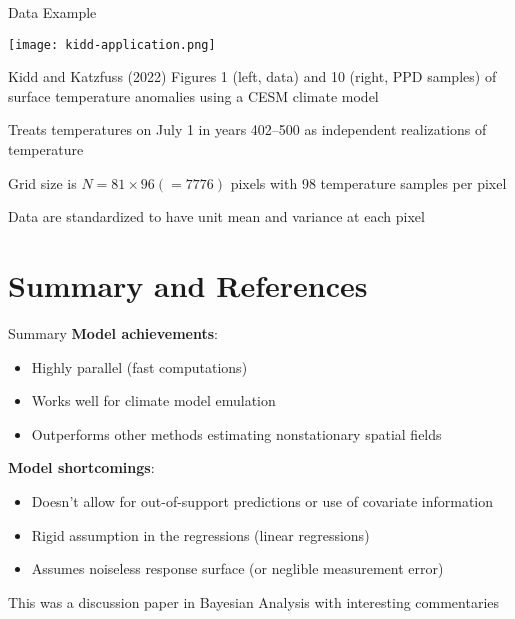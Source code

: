 \documentclass[letterpaper, 10pt, compress]{beamer}
\begin{document}
\begin{frame}{Data Example}
    \begin{center}
        \texttt{[image: kidd-application.png]}
    \end{center}
    Kidd and Katzfuss (2022) Figures 1 (left, data) and 10 (right, PPD samples)
    of surface temperature anomalies using a CESM climate model \cite{kidd-katzfuss2021}
    \medskip\par

    Treats temperatures on July 1 in years 402--500 as independent realizations of
    temperature
    \medskip\par

    Grid size is $N = 81 \times 96 (= 7776)$ pixels with 98 temperature samples
    per pixel
    \medskip\par

    Data are standardized to have unit mean and variance at each pixel
\end{frame}


\section[Summary]{Summary and References}

\begin{frame}{Summary}
    \textbf{Model achievements}:
    \begin{itemize}
        \item Highly parallel (fast computations)
        \item Works well for climate model emulation
        \item Outperforms other methods estimating nonstationary spatial fields
    \end{itemize}
    \medskip\par

    \textbf{Model shortcomings}:
    \begin{itemize}
        \item Doesn't allow for out-of-support predictions or use of covariate information
        \item Rigid assumption in the regressions (linear regressions)
        \item Assumes noiseless response surface (or neglible measurement error)
    \end{itemize}
    \medskip\par

    This was a discussion paper in Bayesian Analysis with interesting commentaries
\end{frame}
\end{document}
